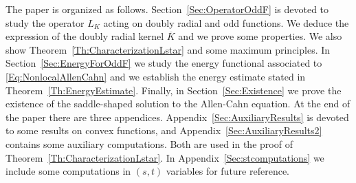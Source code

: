 The paper is organized as follows. Section~\ref{Sec:OperatorOddF} is devoted to study the operator $L_K$ acting on doubly radial and odd functions. We deduce the expression of the doubly radial kernel $\overline{K}$ and we prove some properties. We also show Theorem~\ref{Th:CharacterizationLstar} and some maximum principles. In Section~\ref{Sec:EnergyForOddF} we study the energy functional associated to \eqref{Eq:NonlocalAllenCahn} and we establish the energy estimate stated in Theorem~\ref{Th:EnergyEstimate}. Finally, in Section~\ref{Sec:Existence} we prove the existence of the saddle-shaped solution to the Allen-Cahn equation. At the end of the paper there are three appendices. Appendix~\ref{Sec:AuxiliaryResults} is devoted to some results on convex functions, and Appendix~\ref{Sec:AuxiliaryResults2} contains some auxiliary computations. Both are used in the proof of Theorem~\ref{Th:CharacterizationLstar}. In Appendix~\ref{Sec:stcomputations} we include some computations in $(s,t)$ variables for future reference.